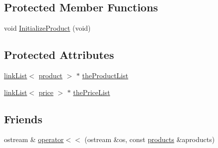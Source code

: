 \subsection*{Protected Member Functions}
\begin{DoxyCompactItemize}
\item 
void \hyperlink{classproducts_ac69f5933f20409ff01e5bee8b7b02899}{InitializeProduct} (void)
\end{DoxyCompactItemize}
\subsection*{Protected Attributes}
\begin{DoxyCompactItemize}
\item 
\hyperlink{classlink_list}{linkList}$<$ \hyperlink{classproduct}{product} $>$ $\ast$ \hyperlink{classproducts_a5ae92c2c7f494dc1a14e2ecd1543fd74}{theProductList}
\item 
\hyperlink{classlink_list}{linkList}$<$ \hyperlink{classprice}{price} $>$ $\ast$ \hyperlink{classproducts_ab1f92b4cbe7296058a19ee473087443f}{thePriceList}
\end{DoxyCompactItemize}
\subsection*{Friends}
\begin{DoxyCompactItemize}
\item 
ostream \& \hyperlink{classproducts_aa678af863c41bbd404f7d8eaf3000493}{operator$<$$<$} (ostream \&os, const \hyperlink{classproducts}{products} \&aproducts)
\end{DoxyCompactItemize}


